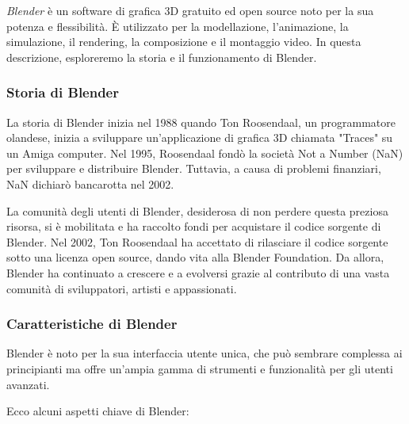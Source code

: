 \textit{Blender} è un software di grafica 3D gratuito ed open source noto per la sua potenza e flessibilità. È utilizzato per la modellazione, l'animazione, la simulazione, il rendering, la composizione e il montaggio video. In questa descrizione, esploreremo la storia e il funzionamento di Blender.

\subsubsection{Storia di Blender}

La storia di Blender inizia nel 1988 quando Ton Roosendaal, un programmatore olandese, inizia a sviluppare un'applicazione di grafica 3D chiamata "Traces" su un Amiga computer. Nel 1995, Roosendaal fondò la società Not a Number (NaN) per sviluppare e distribuire Blender. Tuttavia, a causa di problemi finanziari, NaN dichiarò bancarotta nel 2002.

La comunità degli utenti di Blender, desiderosa di non perdere questa preziosa risorsa, si è mobilitata e ha raccolto fondi per acquistare il codice sorgente di Blender. Nel 2002, Ton Roosendaal ha accettato di rilasciare il codice sorgente sotto una licenza open source, dando vita alla Blender Foundation. Da allora, Blender ha continuato a crescere e a evolversi grazie al contributo di una vasta comunità di sviluppatori, artisti e appassionati.

\subsubsection{Caratteristiche di Blender}

Blender è noto per la sua interfaccia utente unica, che può sembrare complessa ai principianti ma offre un'ampia gamma di strumenti e funzionalità per gli utenti avanzati. 

Ecco alcuni aspetti chiave di Blender:

